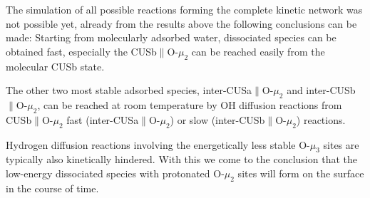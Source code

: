 \documentclass[11pt,DIV=13,BCOR=5mm,a4paper,headinclude]{scrbook}
\begin{document}
The simulation of all possible reactions forming the complete kinetic network was not possible yet, already from the results above the following conclusions can be made:
Starting from molecularly adsorbed water, dissociated species can be obtained fast, especially the CUSb$\parallel$O-$\mu_2$ can be reached easily from the molecular CUSb state.

The other two most stable adsorbed species, inter-CUSa$\parallel$O-$\mu_2$ and inter-CUSb$\parallel$O-$\mu_2$, can be reached at room temperature by OH diffusion reactions from CUSb$\parallel$O-$\mu_2$ fast (inter-CUSa$\parallel$O-$\mu_2$) or slow (inter-CUSb$\parallel$O-$\mu_2$) reactions.

Hydrogen diffusion reactions involving the energetically less stable O-$\mu_3$ sites are typically also kinetically hindered.
With this we come to the conclusion that the low-energy dissociated species with protonated O-$\mu_2$ sites will form on the surface in the course of time.
\end{document}
